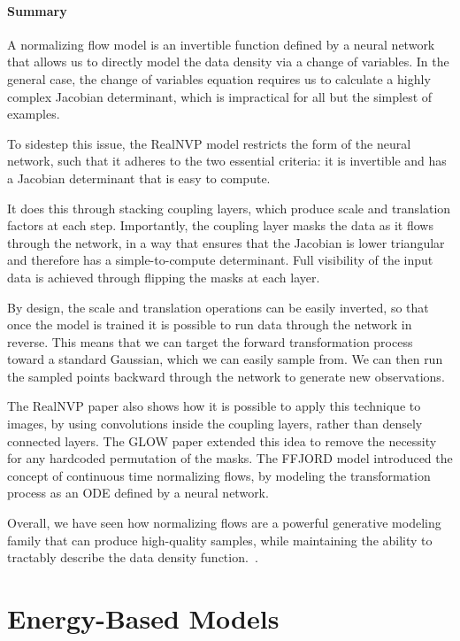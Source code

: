 \paragraph{Summary}

A normalizing flow model is an invertible function defined by a neural network that allows us to directly model the data density via a change of variables.
In the general case, the change of variables equation requires us to calculate a highly complex Jacobian determinant, which is impractical for all but the simplest of examples.

To sidestep this issue, the RealNVP model restricts the form of the neural network, such that it adheres to the two essential criteria: it is invertible and has a Jacobian determinant that is easy to compute.

It does this through stacking coupling layers, which produce scale and translation factors at each step.
Importantly, the coupling layer masks the data as it flows through the network, in a way that ensures that the Jacobian is lower triangular and therefore has a simple-to-compute determinant.
Full visibility of the input data is achieved through flipping the masks at each layer.

By design, the scale and translation operations can be easily inverted, so that once the model is trained it is possible to run data through the network in reverse.
This means that we can target the forward transformation process toward a standard Gaussian, which we can easily sample from.
We can then run the sampled points backward through the network to generate new observations.

The RealNVP paper also shows how it is possible to apply this technique to images, by using convolutions inside the coupling layers, rather than densely connected layers.
The GLOW paper extended this idea to remove the necessity for any hardcoded permutation of the masks.
The FFJORD model introduced the concept of continuous time normalizing flows, by modeling the transformation process as an ODE defined by a neural network.

Overall, we have seen how normalizing flows are a powerful generative modeling family that can produce high-quality samples, while maintaining the ability to tractably describe the data density function.~\cite{foster2022generative}.

\section{Energy-Based Models}


